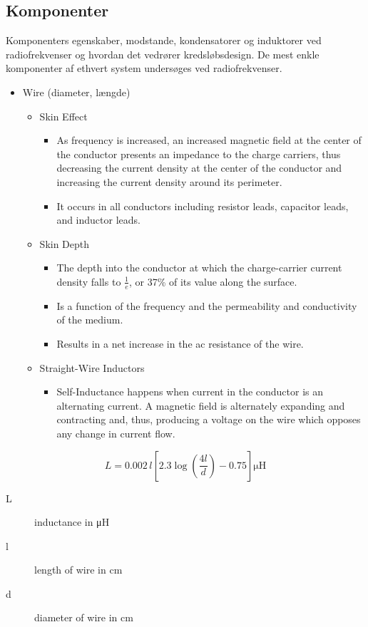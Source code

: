 \subsection{Komponenter}
Komponenters egenskaber, modstande, kondensatorer og induktorer ved radiofrekvenser og hvordan det vedrører kredsløbsdesign. De mest enkle komponenter af ethvert system undersøges ved radiofrekvenser.
\begin{itemize}
	\item Wire (diameter, længde)
	\begin{itemize}
		\item Skin Effect
		\begin{itemize}
			\item As frequency is increased, an increased magnetic field at the center of the conductor presents an impedance to the charge carriers, thus decreasing the current density at the center of the conductor and increasing the current density around its perimeter.
			\item It occurs in all conductors including resistor leads,
			capacitor leads, and inductor leads.
		\end{itemize}
		\item Skin Depth
		\begin{itemize}
			\item The depth into the conductor at which the charge-carrier current density falls to $\frac{1}{e}$, or 37\% of its value along the surface.
			\item Is a function of the frequency and the permeability and conductivity of the medium.
			\item Results in a net increase in	the ac resistance of the wire.
		\end{itemize} 
		\item Straight-Wire Inductors
		\begin{itemize}
			\item Self-Inductance happens when current in the conductor is an alternating current. A magnetic field is alternately expanding
			and contracting and, thus, producing a voltage on the wire which
			opposes any change in current flow.
		\end{itemize}
	\end{itemize}
\end{itemize}

\begin{equation}
L = 0.002\,l\left[2.3\log\left(\dfrac{4l}{d}\right)-0.75\right] \si{\micro\henry}
\end{equation}
\begin{description}
	\item[L] inductance in \si{\micro\henry}
	\item[l] length of wire in \si{\centi\meter}
	\item[d] diameter of wire in \si{\centi\meter}
\end{description}

